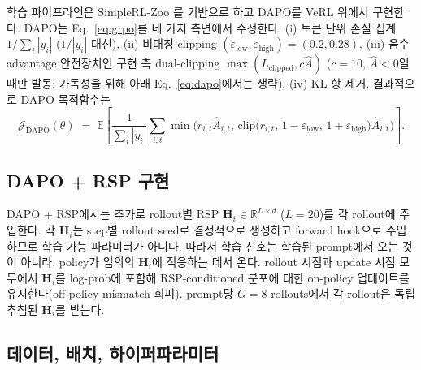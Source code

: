 학습 파이프라인은 SimpleRL-Zoo \citep{zeng2025simplerl}를 기반으로 하고 DAPO를 VeRL \citep{sheng2024hybridflow} 위에서 구현한다. DAPO는 Eq.~\eqref{eq:grpo}를 네 가지 측면에서 수정한다. (i) 토큰 단위 손실 집계 $1/\sum_i|y_i|$ ($1/|y_i|$ 대신), (ii) 비대칭 clipping $(\varepsilon_{\text{low}},\varepsilon_{\text{high}})=(0.2,0.28)$, (iii) 음수 advantage 안전장치인 구현 측 dual-clipping $\max(L_{\text{clipped}},c\hat{A})$ ($c=10$, $\hat{A}<0$일 때만 발동; 가독성을 위해 아래 Eq.~\eqref{eq:dapo}에서는 생략), (iv) KL 항 제거. 결과적으로 DAPO 목적함수는
\begin{equation}\label{eq:dapo}
\mathcal{J}_{\text{DAPO}}(\theta)
\;=\;
\mathbb{E}\!\left[
\frac{1}{\sum_i|y_i|}
\sum_{i,t}
\min\!\Big(r_{i,t}\hat{A}_{i,t},\,
\text{clip}\big(r_{i,t},\,1{-}\varepsilon_{\text{low}},\,1{+}\varepsilon_{\text{high}}\big)\hat{A}_{i,t}\Big)
\right].
\end{equation}

\subsection{DAPO + RSP 구현}\label{app:dapo_rsp_impl}

DAPO + RSP에서는 추가로 rollout별 RSP $\mathbf{H}_i \in \mathbb{R}^{L \times d}$ ($L=20$)를 각 rollout에 주입한다. 각 $\mathbf{H}_i$는 step별 rollout seed로 결정적으로 생성하고 forward hook으로 주입하므로 학습 가능 파라미터가 아니다. 따라서 학습 신호는 학습된 prompt에서 오는 것이 아니라, policy가 임의의 $\mathbf{H}_i$에 적응하는 데서 온다. rollout 시점과 update 시점 모두에서 $\mathbf{H}_i$를 log-prob에 포함해 RSP-conditioned 분포에 대한 on-policy 업데이트를 유지한다(off-policy mismatch 회피). prompt당 $G=8$ rollouts에서 각 rollout은 독립 추첨된 $\mathbf{H}_i$를 받는다.

\subsection{데이터, 배치, 하이퍼파라미터}

